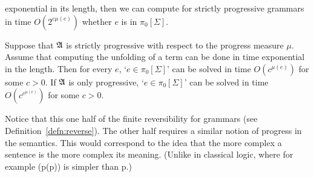 exponential in its length, then we can compute for strictly 
progressive grammars in time $O(2^{c\mu(e)})$ whether $e$ is 
in $\pi_0[\Sigma]$.
\begin{thm}
Suppose that $\mathfrak{A}$ is strictly progressive with respect to the 
pro\-gress measure $\mu$. Assume that computing the unfolding of a 
term can be done in time exponential in the length. Then for every $e$, 
`$e \in \pi_0[\Sigma]$' can be solved in time $O(c^{\mu(e)})$ 
for some $c > 0$. If $\mathfrak{A}$ is only progressive, `$e \in \pi_0[\Sigma]$' 
can be solved in time $O(c^{c^{\mu(e)}})$ for some $c > 0$.
\end{thm}
Notice that this one half of the finite reversibility for grammars 
(see Definition~\ref{defn:reverse}). The other half requires a similar 
notion of progress in the semantics. This would correspond to the 
idea that the more complex a sentence is the more complex its meaning. 
(Unlike in classical logic, where for example 
{\mtt (p(p))} is simpler than {\mtt p}.)

